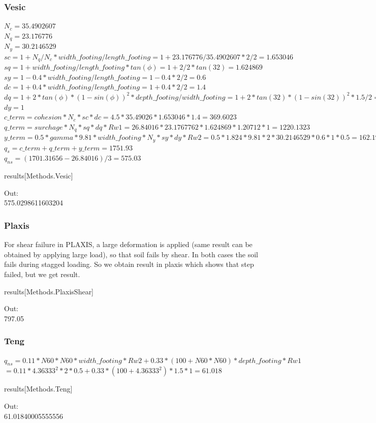 \subsubsection{Vesic}
$N_c=35.4902607$\\
$N_q=23.176776$\\
$N_y=30.2146529$\\
$sc=1+N_q/N_c*width\_footing/length\_footing= 1+23.176776/35.4902607*2/2=1.653046$\\
$sq=1+width\_footing/length\_footing*tan(\phi)=1+2/2*tan(32)=1.624869$\\
$sy=1-0.4*width\_footing/length\_footing=1-0.4*2/2=0.6$\\
$dc = 1 +0.4*width\_footing/length\_footing=1+0.4*2/2=1.4$\\
$dq = 1 +2*tan(\phi)*(1-sin(\phi))^2 * depth\_footing/width\_footing=1+2*tan(32)*(1-sin(32))^2*1.5/2=1.20712$\\
$dy=1$\\
$c\_term = cohesion*N_c*sc*dc=4.5*35.49026*1.653046*1.4=369.6023$\\
$q\_term = surchage*N_q*sq*dq*Rw1=26.84016*23.1767762*1.624869*1.20712*1=1220.1323$\\
$y\_term = 0.5*gamma*9.81*width\_footing*N_y*sy*dy*Rw2=0.5*1.824*9.81*2*30.2146529*0.6*1*0.5=162.19322$\\
$q_s = c\_term+q\_term+y\_term=1751.93$\\
$q_{ns} = (1701.31656 - 26.84016)/3 = 575.03$
\begin{python}
results[Methods.Vesic]
\end{python}
Out:\\
575.0298611603204

\subsubsection{Plaxis}
For shear failure in PLAXIS, a large deformation is applied (same result can be obtained by applying large load), so that soil fails by shear. In both cases the soil fails during stagged loading. So we obtain result in plaxis which shows that step failed, but we get result.
\begin{python}
results[Methods.PlaxisShear]
\end{python}
Out:\\
797.05

\subsubsection{Teng}
$q_{ns} = 0.11*N60*N60*width\_footing*Rw2+0.33*(100+N60*N60)*depth\_footing*Rw1$\\
$= 0.11*4.36333^2*2*0.5+0.33*(100+4.36333^2)*1.5*1 = 61.018$
\begin{python}
results[Methods.Teng]
\end{python}
Out:\\
61.01840005555556


